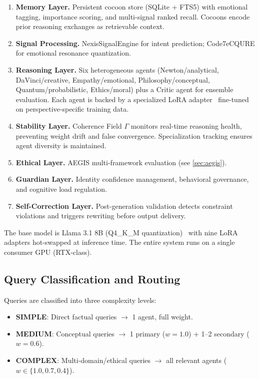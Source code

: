 \documentclass[11pt,a4paper]{article}
\begin{document}
\begin{enumerate}[leftmargin=*]
  \item \textbf{Memory Layer.} Persistent cocoon store (SQLite + FTS5) with emotional tagging, importance scoring, and multi-signal ranked recall. Cocoons encode prior reasoning exchanges as retrievable context.

  \item \textbf{Signal Processing.} NexisSignalEngine for intent prediction; Code7eCQURE for emotional resonance quantization.

  \item \textbf{Reasoning Layer.} Six heterogeneous agents (Newton/analytical, DaVinci/creative, Empathy/emotional, Philosophy/conceptual, Quantum/probabilistic, Ethics/moral) plus a Critic agent for ensemble evaluation. Each agent is backed by a specialized LoRA adapter~\citep{hu2021lora} fine-tuned on perspective-specific training data.

  \item \textbf{Stability Layer.} Coherence Field $\Gamma$ monitors real-time reasoning health, preventing weight drift and false convergence. Specialization tracking ensures agent diversity is maintained.

  \item \textbf{Ethical Layer.} AEGIS multi-framework evaluation (see \cref{sec:aegis}).

  \item \textbf{Guardian Layer.} Identity confidence management, behavioral governance, and cognitive load regulation.

  \item \textbf{Self-Correction Layer.} Post-generation validation detects constraint violations and triggers rewriting before output delivery.
\end{enumerate}

The base model is Llama 3.1 8B (Q4\_K\_M quantization)~\citep{grattafiori2024llama} with nine LoRA adapters hot-swapped at inference time. The entire system runs on a single consumer GPU (RTX-class).

\subsection{Query Classification and Routing}

Queries are classified into three complexity levels:
\begin{itemize}[nosep]
  \item \textbf{SIMPLE}: Direct factual queries $\to$ 1 agent, full weight.
  \item \textbf{MEDIUM}: Conceptual queries $\to$ 1 primary ($w=1.0$) + 1--2 secondary ($w=0.6$).
  \item \textbf{COMPLEX}: Multi-domain/ethical queries $\to$ all relevant agents ($w \in \{1.0, 0.7, 0.4\}$).
\end{itemize}
\end{document}
